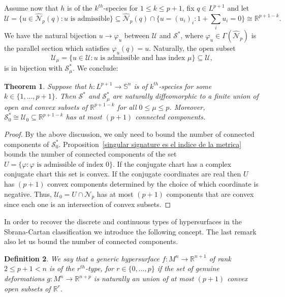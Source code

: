 \documentclass{article}
\newtheorem{thm}{Theorem}[section]
\newtheorem{defn}[thm]{Definition}
\theoremstyle{remark}
\begin{document}
Assume now that $h$ is of the $k^{th}$-species for $1\leq k\leq p+1$, fix $q\in L^{p+1}$ and let
\begin{equation}\label{mathcal U}
    \mathcal{U}=\{u\in\hat{\mathcal{N}}_p(q):u\text{ is admissible}\}\subseteq\hat{\mathcal{N}}_p(q)\cap\{u=(u_i)_i:1+\sum_iu_i=0\}\cong\mathbb{R}^{p+1-k}.
\end{equation}
We have the natural bijection $u\rightarrow\varphi_u$ between $\mathcal{U}$ and $\mathcal{S}^{*}$, where $\varphi_u\in\Gamma(\hat{\mathcal{N}}_p)$ is the parallel section which satisfies $\varphi_u(q)=u$.
Naturally, the open subset 
\begin{equation}\label{mathcal Ur}
    \mathcal{U}_\mu=\{u\in\mathcal{U}:u\text{ is admissible and has index }\mu\}\subseteq\mathcal{U},
\end{equation}
is in bijection with $\mathcal{S}^{*}_\mu$.
We conclude:
\begin{thm}\label{S* es un abierto de R}
    Suppose that $h:L^{p+1}\rightarrow\mathbb{S}^{n}$ is of $k^{th}$-species for some $k\in\{1,\ldots,p+1\}$. Then $\mathcal{S}^{*}$ and $\mathcal{S}_\mu^{*}$ are naturally diffeomorphic to a finite union of open and convex subsets of $\mathbb{R}^{p+1-k}$ for all $0\leq\mu\leq p$. Moreover, $\mathcal{S}_0^{*}\cong\mathcal{U}_0\subseteq\mathbb{R}^{p+1-k}$ has at most $(p+1)$ connected components.
\end{thm}
\begin{proof}
    By the above discussion, we only need to bound the number of connected components of $\mathcal{S}_0^{*}$. Proposition~\ref{singular signature es el indice de la metrica} bounds the number of connected components of the set $U=\{\varphi:\varphi\text{ is admissible of index } 0\}$. 
    If the conjugate chart has a complex conjugate chart this set is convex. If the conjugate coordinates are real then $U$ has $(p+1)$ convex components determined by the choice of which coordinate is negative. Thus, $\mathcal{U}_0=U\cap\mathcal{N}_p$ has at most $(p+1)$ components that are convex since each one is an intersection of convex subsets.
\end{proof}

In order to recover the discrete and continuous types of hypersurfaces in the Sbrana-Cartan classification we introduce the following concept. The last remark also let us bound the number of connected components.
\begin{defn}\label{definicion tipo}
    \normalfont We say that a generic hypersurface $f:M^n\rightarrow\mathbb{R}^{n+1}$ of rank $2\leq p+1<n$ is of the {\it $r^{th}$-type}, for $r\in\{0,\ldots, p\}$ if the set of genuine deformations $g:M^n\rightarrow\mathbb{R}^{n+p}$ is naturally an union of at most $(p+1)$ convex open subsets of $\mathbb{R}^{r}$.
\end{defn}
\end{document}
